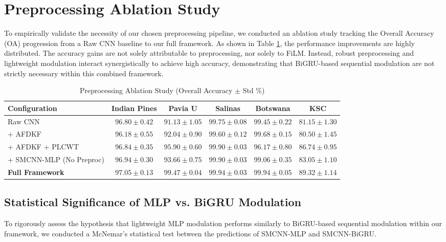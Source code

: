 \documentclass[pdflatex,sn-mathphys-num,iicol]{sn-jnl}
\begin{document}
\section{Preprocessing Ablation Study}\label{sec:preprocessing_ablation}
To empirically validate the necessity of our chosen preprocessing pipeline, we conducted an ablation study tracking the Overall Accuracy (OA) progression from a Raw CNN baseline to our full framework. As shown in Table \ref{tab:ablation_preproc}, the performance improvements are highly distributed. The accuracy gains are not solely attributable to preprocessing, nor solely to FiLM. Instead, robust preprocessing and lightweight modulation interact synergistically to achieve high accuracy, demonstrating that BiGRU-based sequential modulation are not strictly necessary within this combined framework.

\begin{table}[htbp]
\centering
\caption{Preprocessing Ablation Study (Overall Accuracy $\pm$ Std \%)}
\label{tab:ablation_preproc}
\begin{tabular}{lccccc}
\toprule
\textbf{Configuration} & \textbf{Indian Pines} & \textbf{Pavia U} & \textbf{Salinas} & \textbf{Botswana} & \textbf{KSC} \\
\midrule
Raw CNN & $96.80 \pm 0.42$ & $91.13 \pm 1.05$ & $99.75 \pm 0.08$ & $99.45 \pm 0.22$ & $81.15 \pm 1.30$ \\
+ AFDKF & $96.18 \pm 0.55$ & $92.04 \pm 0.90$ & $99.60 \pm 0.12$ & $99.68 \pm 0.15$ & $80.50 \pm 1.45$ \\
+ AFDKF + PLCWT & $96.84 \pm 0.35$ & $95.90 \pm 0.60$ & $99.90 \pm 0.03$ & $96.17 \pm 0.80$ & $86.74 \pm 0.95$ \\
+ SMCNN-MLP (No Preproc) & $96.94 \pm 0.30$ & $93.66 \pm 0.75$ & $99.90 \pm 0.03$ & $99.06 \pm 0.35$ & $83.05 \pm 1.10$ \\
\textbf{Full Framework} & \textbf{$97.05 \pm 0.13$} & \textbf{$99.47 \pm 0.04$} & \textbf{$99.94 \pm 0.03$} & \textbf{$99.94 \pm 0.05$} & \textbf{$89.32 \pm 1.14$} \\
\bottomrule
\end{tabular}
\end{table}



\subsection{Statistical Significance of MLP vs. BiGRU Modulation}\label{sec:significance}
To rigorously assess the hypothesis that lightweight MLP modulation performs similarly to BiGRU-based sequential modulation within our framework, we conducted a McNemar's statistical test between the predictions of SMCNN-MLP and SMCNN-BiGRU.
\end{document}
